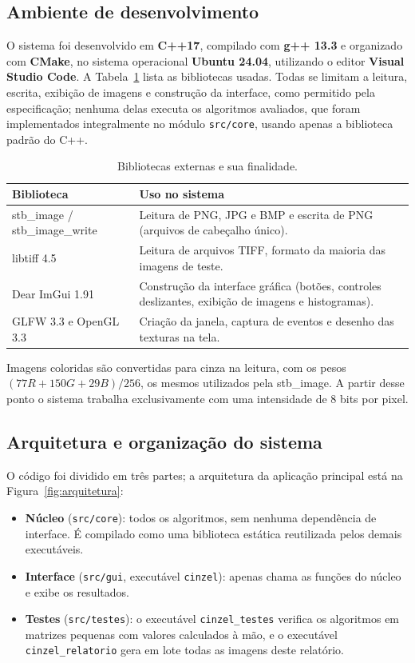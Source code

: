 \documentclass[11pt,a4paper]{article}
\begin{document}
\subsection{Ambiente de desenvolvimento}

O sistema foi desenvolvido em \textbf{C++17}, compilado com \textbf{g++ 13.3} e organizado com
\textbf{CMake}, no sistema operacional \textbf{Ubuntu 24.04}, utilizando o editor
\textbf{Visual Studio Code}. A Tabela~\ref{tab:bibliotecas} lista as bibliotecas usadas. Todas
se limitam a leitura, escrita, exibição de imagens e construção da interface, como permitido
pela especificação; nenhuma delas executa os algoritmos avaliados, que foram implementados
integralmente no módulo \texttt{src/core}, usando apenas a biblioteca padrão do C++.

\begin{table}[H]
\centering
\small
\begin{tabularx}{\textwidth}{lX}
\toprule
\textbf{Biblioteca} & \textbf{Uso no sistema} \\
\midrule
stb\_image / stb\_image\_write & Leitura de PNG, JPG e BMP e escrita de PNG (arquivos de cabeçalho único). \\
libtiff 4.5 & Leitura de arquivos TIFF, formato da maioria das imagens de teste. \\
Dear ImGui 1.91 & Construção da interface gráfica (botões, controles deslizantes, exibição de imagens e histogramas). \\
GLFW 3.3 e OpenGL 3.3 & Criação da janela, captura de eventos e desenho das texturas na tela. \\
\bottomrule
\end{tabularx}
\caption{Bibliotecas externas e sua finalidade.}
\label{tab:bibliotecas}
\end{table}

Imagens coloridas são convertidas para cinza na leitura, com os pesos
$(77R + 150G + 29B)/256$, os mesmos utilizados pela stb\_image. A partir desse ponto o sistema
trabalha exclusivamente com uma intensidade de 8 bits por pixel.

\subsection{Arquitetura e organização do sistema}

O código foi dividido em três partes; a arquitetura da aplicação principal está na Figura~\ref{fig:arquitetura}:
\begin{itemize}
  \item \textbf{Núcleo} (\texttt{src/core}): todos os algoritmos, sem nenhuma dependência de
        interface. É compilado como uma biblioteca estática reutilizada pelos demais
        executáveis.
  \item \textbf{Interface} (\texttt{src/gui}, executável \texttt{cinzel}): apenas chama as
        funções do núcleo e exibe os resultados.
  \item \textbf{Testes} (\texttt{src/testes}): o executável \texttt{cinzel\_testes} verifica os
        algoritmos em matrizes pequenas com valores calculados à mão, e o executável
        \texttt{cinzel\_relatorio} gera em lote todas as imagens deste relatório.
\end{itemize}
\end{document}
